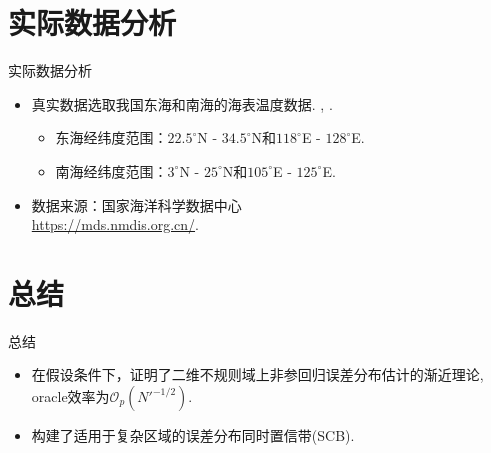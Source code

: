 \documentclass{beamer}
\begin{document}
\section{实际数据分析}
\begin{frame}{实际数据分析}
\begin{itemize}
    \item 真实数据选取我国东海和南海的海表温度数据. \cite{huq2023}, \cite{cai2024global}.
        \begin{itemize}
            \item 东海经纬度范围：$22.5^{\circ}$N - $34.5^{\circ}$N和$118^{\circ}$E - $128^{\circ}$E.
            \item 南海经纬度范围：$3^{\circ}$N - $25^{\circ}$N和$105^{\circ}$E - $125^{\circ}$E.
        \end{itemize}
    \item 数据来源：国家海洋科学数据中心\\
    \url{https://mds.nmdis.org.cn/}.
\end{itemize}
\end{frame}



\section{总结}
\begin{frame}{总结}
\begin{itemize}
    \item 在假设条件下，证明了二维不规则域上非参回归误差分布估计的渐近理论, oracle效率为${\scriptstyle{\mathcal{O}}}_{p}\left(N'^{-1/2}\right)$.
    \item 构建了适用于复杂区域的误差分布同时置信带(SCB).
\end{itemize}
\end{frame}
\end{document}
